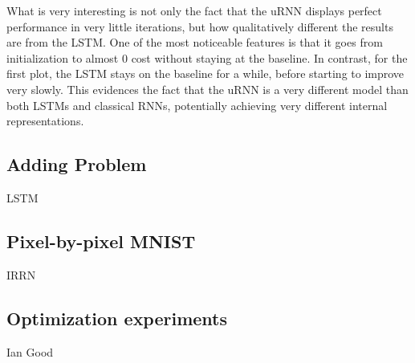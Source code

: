 \documentclass{article} %
\begin{document}
What is very interesting is not only the fact that the uRNN displays perfect performance in very little iterations, but how qualitatively different the results are from the LSTM. One of the most noticeable features is that it goes from initialization to almost 0 cost without staying at the baseline. In contrast, for the first plot, the LSTM stays on the baseline for a while, before starting to improve very slowly. This evidences the fact that the uRNN is a very different model than both LSTMs and classical RNNs, potentially achieving very different internal representations.

\subsection{Adding Problem}
LSTM

\subsection{Pixel-by-pixel MNIST}
IRRN

\subsection{Optimization experiments}
Ian Good



\end{document}
